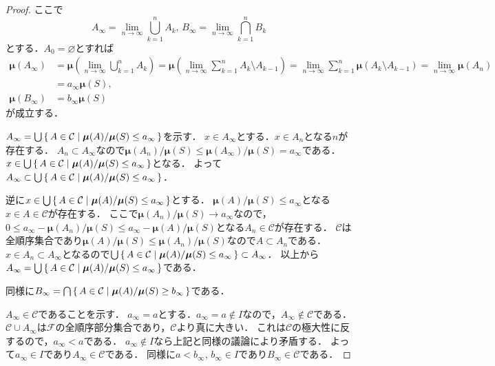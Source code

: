 \begin{proof}
  ここで
  \[ A_\infty = \lim_{n\to\infty} \bigcup_{k=1}^n A_k , \, B_\infty = \lim_{n\to\infty} \bigcap_{k=1}^n B_k \]
  とする．\(A_0 = \varnothing\)とすれば
  \begin{align*}
    \boldsymbol\mu(A_\infty) &= \boldsymbol\mu \left( \lim_{n\to\infty} \bigcup_{k=1}^n A_k \right)
    = \boldsymbol\mu \left( \lim_{n\to\infty} \sum_{k=1}^n A_k \setminus A_{k-1} \right)
    = \lim_{n\to\infty} \sum_{k=1}^n \boldsymbol\mu(A_k \setminus A_{k-1})
    = \lim_{n\to\infty} \boldsymbol\mu(A_n) \\
    &= a_\infty \boldsymbol\mu(S) , \\
    \boldsymbol\mu(B_\infty) &= b_\infty \boldsymbol\mu(S)
  \end{align*}
  が成立する．

  \(A_\infty = \bigcup \set{A\in\mathcal{C} | \boldsymbol\mu(A)/\boldsymbol\mu(S)\leq a_\infty}\)を示す．
  \(x \in A_\infty\)とする．\(x \in A_n\)となる\(n\)が存在する．
  \(A_n \subset A_\infty\)なので\(\boldsymbol\mu(A_n)/\boldsymbol\mu(S) \leq \boldsymbol\mu(A_\infty)/\boldsymbol\mu(S) = a_\infty\)である．
  \(x \in \bigcup \set{A\in\mathcal{C} | \boldsymbol\mu(A)/\boldsymbol\mu(S)\leq a_\infty}\)となる．
  よって\(A_\infty \subset \bigcup \set{A\in\mathcal{C} | \boldsymbol\mu(A)/\boldsymbol\mu(S)\leq a_\infty}\)．

  逆に\(x\in\bigcup \set{A\in\mathcal{C} | \boldsymbol\mu(A)/\boldsymbol\mu(S)\leq a_\infty}\)とする．
  \(\boldsymbol\mu(A)/\boldsymbol\mu(S)\leq a_\infty\)となる\(x\in A\in\mathcal{C}\)が存在する．
  ここで\(\boldsymbol\mu(A_n)/\boldsymbol\mu(S) \to a_\infty\)なので，\(0 \leq a_\infty - \boldsymbol\mu(A_n)/\boldsymbol\mu(S) \leq a_\infty - \boldsymbol\mu(A)/\boldsymbol\mu(S)\)となる\(A_n\in\mathcal{C}\)が存在する．
  \(\mathcal{C}\)は全順序集合であり\(\boldsymbol\mu(A)/\boldsymbol\mu(S) \leq \boldsymbol\mu(A_n)/\boldsymbol\mu(S)\)なので\(A \subset A_n\)である．
  \(x \in A_n \subset A_\infty\)となるので\(\bigcup \set{A\in\mathcal{C} | \boldsymbol\mu(A)/\boldsymbol\mu(S)\leq a_\infty} \subset A_\infty\)．
  以上から\(A_\infty = \bigcup \set{A\in\mathcal{C} | \boldsymbol\mu(A)/\boldsymbol\mu(S)\leq a_\infty}\)である．

  同様に\(B_\infty = \bigcap \set{A\in\mathcal{C} | \boldsymbol\mu(A)/\boldsymbol\mu(S)\geq b_\infty}\)である．

  \(A_\infty \in \mathcal{C}\)であることを示す．
  \(a_\infty = a\)とする．\(a_\infty=a\not\in I\)なので，\(A_\infty\not\in\mathcal{C}\)である．
  \(\mathcal{C} \cup A_\infty\)は\(\mathcal{F}\)の全順序部分集合であり，\(\mathcal{C}\)より真に大きい．
  これは\(\mathcal{C}\)の極大性に反するので，\(a_\infty < a\)である．
  \(a_\infty\not\in I\)なら上記と同様の議論により矛盾する．
  よって\(a_\infty\in I\)であり\(A_\infty \in \mathcal{C}\)である．
  同様に\(a<b_\infty\), \(b_\infty\in I\)であり\(B_\infty \in \mathcal{C}\)である．


\end{proof}
